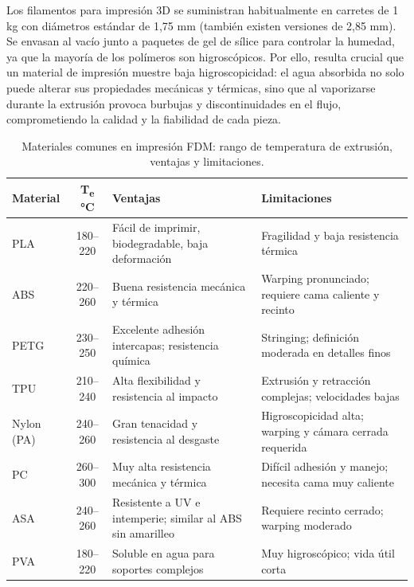 Los filamentos para impresión 3D se suministran habitualmente en carretes de 1 kg con diámetros estándar de 1,75 mm (también existen versiones de 2,85 mm). Se envasan al vacío junto a paquetes de gel de sílice para controlar la humedad, ya que la mayoría de los polímeros son higroscópicos. Por ello, resulta crucial que un material de impresión muestre baja higroscopicidad: el agua absorbida no solo puede alterar sus propiedades mecánicas y térmicas, sino que al vaporizarse durante la extrusión provoca burbujas y discontinuidades en el flujo, comprometiendo la calidad y la fiabilidad de cada pieza.

\begin{table}[h]
  \centering
  \small
  \begin{tabular}{|l|c|p{5cm}|p{5cm}|}
    \hline
    \textbf{Material}    & \textbf{T\textsubscript{e} °C} & \textbf{Ventajas}                          & \textbf{Limitaciones}                             \\
    \hline
    PLA                  & 180–220                           & Fácil de imprimir, biodegradable, baja deformación              & Fragilidad y baja resistencia térmica               \\
    \hline
    ABS                  & 220–260                          & Buena resistencia mecánica y térmica                           & Warping pronunciado; requiere cama caliente y recinto     \\
    \hline
    PETG                 & 230–250                          & Excelente adhesión intercapas; resistencia química             & Stringing; definición moderada en detalles finos       \\
    \hline
    TPU                  & 210–240                         & Alta flexibilidad y resistencia al impacto                     & Extrusión y retracción complejas; velocidades bajas        \\
    \hline
    Nylon (PA)           & 240–260                        & Gran tenacidad y resistencia al desgaste                       & Higroscopicidad alta; warping y cámara cerrada requerida   \\
    \hline
    PC                   & 260–300                          & Muy alta resistencia mecánica y térmica                        & Difícil adhesión y manejo; necesita cama muy caliente      \\
    \hline
    ASA                  & 240–260                           & Resistente a UV e intemperie; similar al ABS sin amarilleo     & Requiere recinto cerrado; warping moderado                 \\
    \hline
    PVA        & 180–220                           & Soluble en agua para soportes complejos                       & Muy higroscópico; vida útil corta                          \\
    \hline
  \end{tabular}
  \caption{Materiales comunes en impresión FDM: rango de temperatura de extrusión, ventajas y limitaciones.}
  \label{tab:materiales_fdm}
\end{table}

